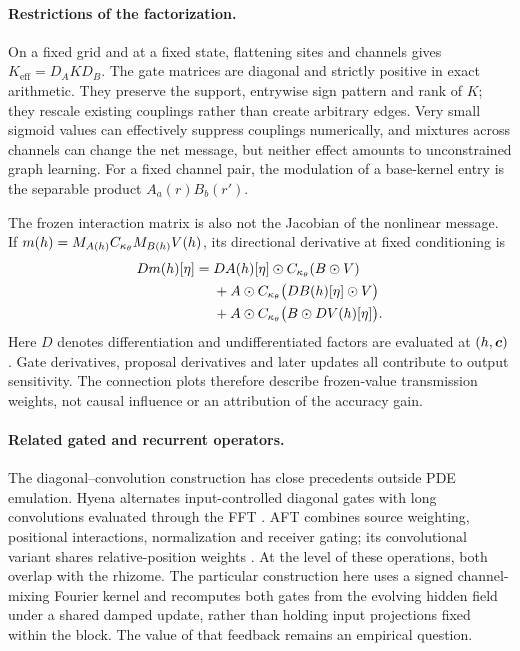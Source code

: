 \paragraph{Restrictions of the factorization.} On a fixed grid and at a fixed state, flattening sites and channels gives $K_{\mathrm{eff}}=D_A K D_B$. The gate matrices are diagonal and strictly positive in exact arithmetic. They preserve the support, entrywise sign pattern and rank of $K$; they rescale existing couplings rather than create arbitrary edges. Very small sigmoid values can effectively suppress couplings numerically, and mixtures across channels can change the net message, but neither effect amounts to unconstrained graph learning. For a fixed channel pair, the modulation of a base-kernel entry is the separable product $A_a(r)B_b(r')$.

The frozen interaction matrix is also not the Jacobian of the nonlinear message. If $m(h)=M_{A(h)}C_{\kappa_\theta} M_{B(h)}V(h)$, its directional derivative at fixed conditioning is
\begin{equation}
  \label{eq:rhizome-jacobian}
  \begin{aligned}
  Dm(h)[\eta]={}&DA(h)[\eta]\odot C_{\kappa_\theta}(B\odot V)\\
  &+A\odot C_{\kappa_\theta}\big(DB(h)[\eta]\odot V\big)\\
  &+A\odot C_{\kappa_\theta}\big(B\odot DV(h)[\eta]\big).
  \end{aligned}
\end{equation}
Here $D$ denotes differentiation and undifferentiated factors are evaluated at $(h,\bm{c})$. Gate derivatives, proposal derivatives and later updates all contribute to output sensitivity. The connection plots therefore describe frozen-value transmission weights, not causal influence or an attribution of the accuracy gain.

\paragraph{Related gated and recurrent operators.} The diagonal--convolution construction has close precedents outside PDE emulation. Hyena alternates input-controlled diagonal gates with long convolutions evaluated through the FFT \citep{poli2023hyena}. AFT combines source weighting, positional interactions, normalization and receiver gating; its convolutional variant shares relative-position weights \citep{zhai2021aft}. At the level of these operations, both overlap with the rhizome. The particular construction here uses a signed channel-mixing Fourier kernel and recomputes both gates from the evolving hidden field under a shared damped update, rather than holding input projections fixed within the block. The value of that feedback remains an empirical question.

